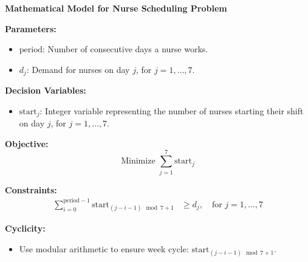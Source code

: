 \documentclass{article}
\begin{document}
\textbf{Mathematical Model for Nurse Scheduling Problem}

\textbf{Parameters:}
\begin{itemize}
    \item \( \text{period} \): Number of consecutive days a nurse works.
    \item \( d_j \): Demand for nurses on day \( j \), for \( j = 1, \ldots, 7 \).
\end{itemize}

\textbf{Decision Variables:}
\begin{itemize}
    \item \( \text{start}_j \): Integer variable representing the number of nurses starting their shift on day \( j \), for \( j = 1, \ldots, 7 \).
\end{itemize}

\textbf{Objective:}
\[
\text{Minimize } \sum_{j=1}^{7} \text{start}_j
\]

\textbf{Constraints:}
\begin{align*}
    \sum_{i=0}^{\text{period}-1} \text{start}_{(j-i-1) \mod 7 + 1} &\geq d_j, \quad \text{for } j = 1, \ldots, 7
\end{align*}

\textbf{Cyclicity:}
\begin{itemize}
    \item Use modular arithmetic to ensure week cycle: \( \text{start}_{(j-i-1) \mod 7 + 1} \).
\end{itemize}
\end{document}
